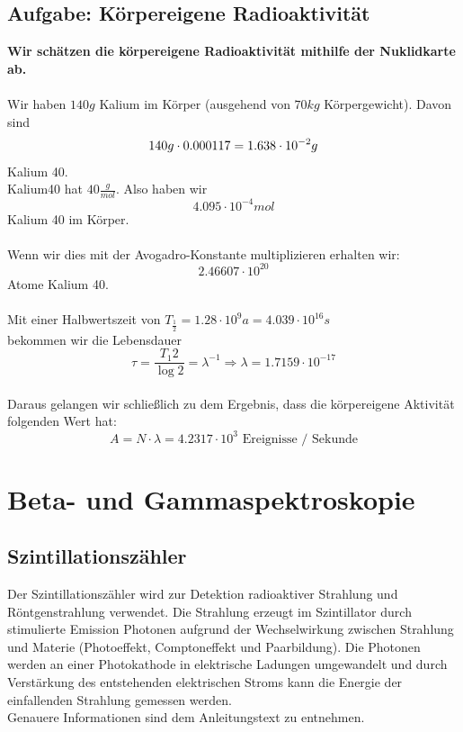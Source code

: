 \documentclass{article}
\begin{document}
\subsection{Aufgabe: Körpereigene Radioaktivität}
\textbf{Wir schätzen die körpereigene Radioaktivität mithilfe der Nuklidkarte ab.}\\
\\
Wir haben $140g$ Kalium im Körper (ausgehend von $70kg$ Körpergewicht).
Davon sind
$$
140g\cdot 0.000117=1.638\cdot10^{-2}g \\
$$
Kalium 40.\\
Kalium40 hat $40\frac{g}{mol}$. Also haben wir \\
$$4.095\cdot10^{-4}mol$$ Kalium 40 im Körper.\\
\\
Wenn wir dies mit der Avogadro-Konstante multiplizieren erhalten wir:\\
$$2.46607\cdot 10^{20}$$ Atome Kalium 40.\\
\\
Mit einer Halbwertszeit von $T_{\frac{1}{2}}= 1.28 \cdot 10^{9}a=4.039\cdot 10^{16}s$ \\
bekommen wir die Lebensdauer $$\tau=\frac{T_{1}{2}}{\log{2}}=\lambda^{-1} \Rightarrow \lambda=1.7159 \cdot 10^{-17}$$
\\
Daraus gelangen wir schließlich zu dem Ergebnis, dass die körpereigene Aktivität folgenden Wert hat:
$$\boxed{A=N\cdot \lambda = 4.2317\cdot 10^{3} \textrm{ Ereignisse / Sekunde}}$$

\section{Beta- und Gammaspektroskopie}

\subsection{Szintillationszähler}
Der Szintillationszähler wird zur Detektion radioaktiver Strahlung und Röntgenstrahlung verwendet. Die Strahlung erzeugt im Szintillator durch stimulierte Emission Photonen aufgrund der Wechselwirkung zwischen Strahlung und Materie (Photoeffekt, Comptoneffekt und Paarbildung). Die Photonen werden an einer Photokathode in elektrische Ladungen umgewandelt und durch Verstärkung des entstehenden elektrischen Stroms kann die Energie der einfallenden Strahlung gemessen werden.\\
Genauere Informationen sind dem Anleitungstext zu entnehmen.
\end{document}
